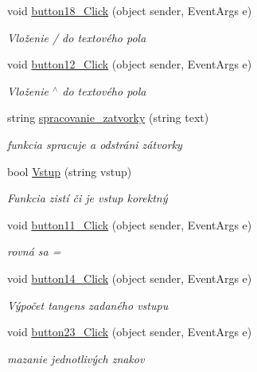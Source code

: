 \begin{DoxyCompactItemize}
void \mbox{\hyperlink{class_i_v_s_1_1_calculator_ac17b0f46c51a9168ee13eb7ec43bf882}{button18\+\_\+\+Click}} (object sender, Event\+Args e)
\begin{DoxyCompactList}\small\item\em Vloženie \textquotesingle{}/\textquotesingle{} do textového pola \end{DoxyCompactList}\item 
void \mbox{\hyperlink{class_i_v_s_1_1_calculator_a654a46c56d62a6b2b11bdf8b729f5102}{button12\+\_\+\+Click}} (object sender, Event\+Args e)
\begin{DoxyCompactList}\small\item\em Vloženie \textquotesingle{}$^\wedge$\textquotesingle{} do textového pola \end{DoxyCompactList}\item 
string \mbox{\hyperlink{class_i_v_s_1_1_calculator_a9c56e5c59d73fbc0bd4db45dc8beb466}{spracovanie\+\_\+zatvorky}} (string text)
\begin{DoxyCompactList}\small\item\em funkcia spracuje a odstráni zátvorky \end{DoxyCompactList}\item 
bool \mbox{\hyperlink{class_i_v_s_1_1_calculator_a1f5a3ec0d3225879502a138d6ce14dec}{Vstup}} (string vstup)
\begin{DoxyCompactList}\small\item\em Funkcia zistí či je vstup korektný \end{DoxyCompactList}\item 
void \mbox{\hyperlink{class_i_v_s_1_1_calculator_af183a6b7dd102cfeceb0bff1495e9a0e}{button11\+\_\+\+Click}} (object sender, Event\+Args e)
\begin{DoxyCompactList}\small\item\em rovná sa = \end{DoxyCompactList}\item 
void \mbox{\hyperlink{class_i_v_s_1_1_calculator_acbac3db9d87c440d5f18b67349b8cd29}{button14\+\_\+\+Click}} (object sender, Event\+Args e)
\begin{DoxyCompactList}\small\item\em Výpočet tangens zadaného vstupu \end{DoxyCompactList}\item 
void \mbox{\hyperlink{class_i_v_s_1_1_calculator_a429d9cfc3bda07afb25f3acdec8894b2}{button23\+\_\+\+Click}} (object sender, Event\+Args e)
\begin{DoxyCompactList}\small\item\em mazanie jednotlivých znakov \end{DoxyCompactList}\item 

\end{DoxyCompactItemize}
